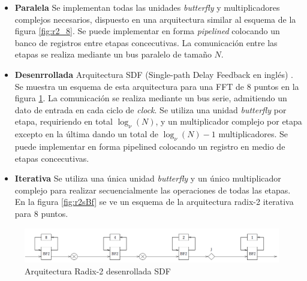 \begin{itemize}
  \item \textbf{Paralela} Se implementan todas las unidades \textit{butterfly} y multiplicadores
  complejos necesarios, dispuesto en una arquitectura similar al esquema de la figura
  \ref{fig:r2_8}. Se puede implementar en forma \textit{pipelined} colocando un banco de registros
  entre etapas concecutivas. La comunicación entre las etapas se realiza mediante un bus paralelo de
  tamaño $N$.
  \item \textbf{Desenrrollada} Arquitectura SDF (Single-path Delay Feedback en inglés)
  \cite{torkelson}. Se muestra un esquema de esta arquitectura para una FFT de $8$ puntos en la
  figura \ref{fig:r2sdf}. La comunicación se realiza mediante un bus serie, admitiendo un dato de
  entrada en cada ciclo de \textit{clock}. Se utiliza una unidad \textit{butterfly} por etapa,
  requiriendo en total $\log_\nu(N)$, y un multiplicador complejo por etapa excepto en la última
  dando un total de $ \log_\nu(N)-1$ multiplicadores. Se puede implementar en forma pipelined
  colocando un registro en medio de etapas concecutivas.
  \item \textbf{Iterativa} Se utiliza una única unidad \textit{butterfly} y un único multiplicador
  complejo para realizar secuencialmente las operaciones de todas las etapas. En la figura \ref{fig:r2sBf} se ve un esquema de la
  arquitectura radix-2 iterativa para $8$ puntos. 
\end{itemize}

\begin{figure}[htb!]
        \centering
        \includegraphics[width=13cm]{./figures/r2sdf.png}
        \caption{Arquitectura Radix-2 desenrollada SDF}
        \label{fig:r2sdf}
\end{figure}


